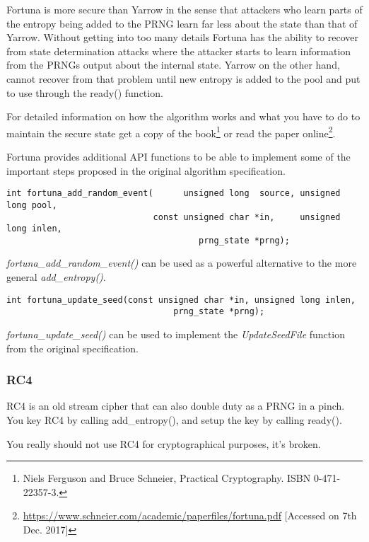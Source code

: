 \documentclass[synpaper]{book}
\begin{document}
Fortuna is more secure than Yarrow in the sense that attackers who learn parts of the entropy being
added to the PRNG learn far less about the state than that of Yarrow.  Without getting into too many
details Fortuna has the ability to recover from state determination attacks where the attacker starts
to learn information from the PRNGs output about the internal state.  Yarrow on the other hand, cannot
recover from that problem until new entropy is added to the pool and put to use through the ready() function.

For detailed information on how the algorithm works and what you have to do to maintain the secure state
get a copy of the book\footnote{Niels Ferguson and Bruce Schneier, Practical Cryptography. ISBN 0-471-22357-3.} or
read the paper online\footnote{\url{https://www.schneier.com/academic/paperfiles/fortuna.pdf} [Accessed on 7th Dec. 2017]}.

Fortuna provides additional API functions to be able to implement some of the important steps proposed in the original algorithm specification.

\begin{verbatim}
int fortuna_add_random_event(      unsigned long  source, unsigned long pool,
                             const unsigned char *in,     unsigned long inlen,
                                      prng_state *prng);
\end{verbatim}

\textit{fortuna\_add\_random\_event()} can be used as a powerful alternative to the more general \textit{add\_entropy()}.

\begin{verbatim}
int fortuna_update_seed(const unsigned char *in, unsigned long inlen,
                                 prng_state *prng);
\end{verbatim}

\textit{fortuna\_update\_seed()} can be used to implement the \textit{UpdateSeedFile} function from the original specification.


\subsubsection{RC4}

RC4 is an old stream cipher that can also double duty as a PRNG in a pinch.  You key RC4 by
calling add\_entropy(), and setup the key by calling ready().

You really should not use RC4 for cryptographical purposes, it's broken.
\end{document}

